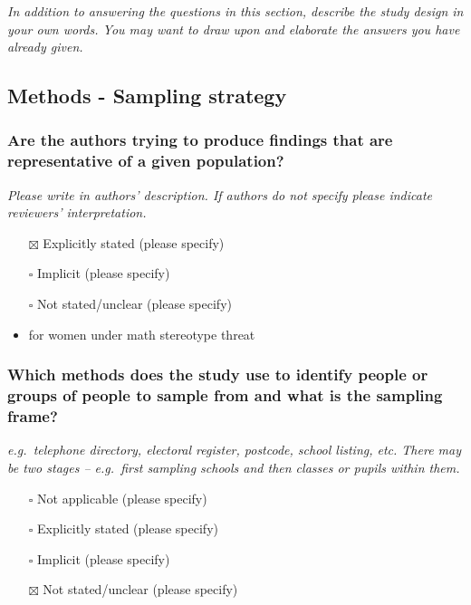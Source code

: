 \documentclass[
  doc, a4paper]{apa7}
\providecommand{\tightlist}{%
  \setlength{\itemsep}{0pt}\setlength{\parskip}{0pt}}
\begin{document}
\emph{In addition to answering the questions in this section, describe the study design in your own words. You may want to draw upon and elaborate the answers you have already given.}

\subsection{Methods - Sampling strategy}\label{methods---sampling-strategy}

\subsubsection{Are the authors trying to produce findings that are representative of a given population?}\label{are-the-authors-trying-to-produce-findings-that-are-representative-of-a-given-population}

\emph{Please write in authors' description. If authors do not specify please indicate reviewers' interpretation.}

\begin{itemize}
\item[$\boxtimes$]
  Explicitly stated (please specify)
\item[$\square$]
  Implicit (please specify)
\item[$\square$]
  Not stated/unclear (please specify)
\item
  for women under math stereotype threat
\end{itemize}

\subsubsection{Which methods does the study use to identify people or groups of people to sample from and what is the sampling frame?}\label{which-methods-does-the-study-use-to-identify-people-or-groups-of-people-to-sample-from-and-what-is-the-sampling-frame}

\emph{e.g.~telephone directory, electoral register, postcode, school listing, etc. There may be two stages -- e.g.~first sampling schools and then classes or pupils within them.}

\begin{itemize}
\tightlist
\item[$\square$]
  Not applicable (please specify)
\item[$\square$]
  Explicitly stated (please specify)
\item[$\square$]
  Implicit (please specify)
\item[$\boxtimes$]
  Not stated/unclear (please specify)
\end{itemize}
\end{document}
